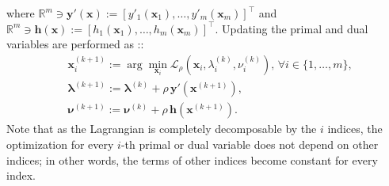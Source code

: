 \documentclass[lang=cn,10pt]{gorgeousnbook}
\numberwithin{equation}{section}%
\numberwithin{figure}{section}%
\begin{document}
where $\mathbb{R}^m \ni \boldsymbol{y}'(\boldsymbol{x}) := [y'_1(\boldsymbol{x}_1), \dots, y'_m(\boldsymbol{x}_m)]^\top$ and $\mathbb{R}^m \ni \boldsymbol{h}(\boldsymbol{x}) := [h_1(\boldsymbol{x}_1), \dots, h_m(\boldsymbol{x}_m)]^\top$.
Updating the primal and dual variables are performed as \cite{giesen2016distributed,giesen2019combining}::
\begin{align*}
& \boldsymbol{x}_i^{(k+1)} := \arg\min_{\boldsymbol{x}_i} \mathcal{L}_\rho(\boldsymbol{x}_i, \lambda_i^{(k)}, \nu_i^{(k)}),\, \forall i \in \{1, \dots, m\}, \\
& \boldsymbol{\lambda}^{(k+1)} := \boldsymbol{\lambda}^{(k)} + \rho\, \boldsymbol{y}'(\boldsymbol{x}^{(k+1)}), \\
& \boldsymbol{\nu}^{(k+1)} := \boldsymbol{\nu}^{(k)} + \rho\, \boldsymbol{h}(\boldsymbol{x}^{(k+1)}).
\end{align*}
Note that as the Lagrangian is completely decomposable by the $i$ indices, the optimization for every $i$-th primal or dual variable does not depend on other indices; in other words, the terms of other indices become constant for every index.
\end{document}

